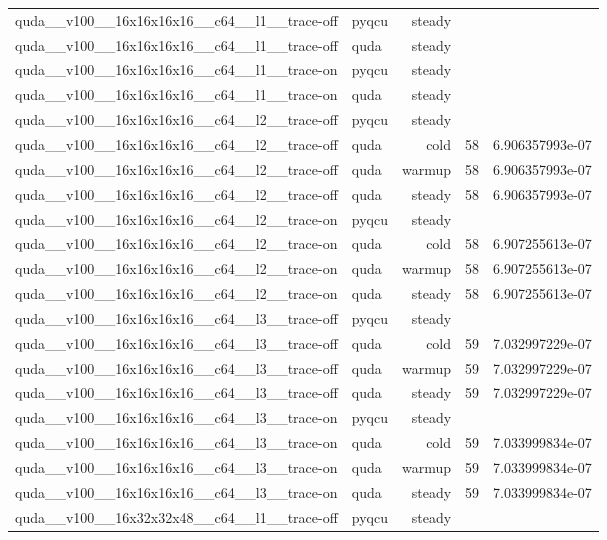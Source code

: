 \begin{table}[htbp]
\begin{tabular}{@{}llrrr@{}}
quda\_\_v100\_\_16x16x16x16\_\_c64\_\_l1\_\_trace-off & pyqcu & steady &  &  \\
quda\_\_v100\_\_16x16x16x16\_\_c64\_\_l1\_\_trace-off & quda & steady &  &  \\
quda\_\_v100\_\_16x16x16x16\_\_c64\_\_l1\_\_trace-on & pyqcu & steady &  &  \\
quda\_\_v100\_\_16x16x16x16\_\_c64\_\_l1\_\_trace-on & quda & steady &  &  \\
quda\_\_v100\_\_16x16x16x16\_\_c64\_\_l2\_\_trace-off & pyqcu & steady &  &  \\
quda\_\_v100\_\_16x16x16x16\_\_c64\_\_l2\_\_trace-off & quda & cold & 58 & 6.906357993e-07 \\
quda\_\_v100\_\_16x16x16x16\_\_c64\_\_l2\_\_trace-off & quda & warmup & 58 & 6.906357993e-07 \\
quda\_\_v100\_\_16x16x16x16\_\_c64\_\_l2\_\_trace-off & quda & steady & 58 & 6.906357993e-07 \\
quda\_\_v100\_\_16x16x16x16\_\_c64\_\_l2\_\_trace-on & pyqcu & steady &  &  \\
quda\_\_v100\_\_16x16x16x16\_\_c64\_\_l2\_\_trace-on & quda & cold & 58 & 6.907255613e-07 \\
quda\_\_v100\_\_16x16x16x16\_\_c64\_\_l2\_\_trace-on & quda & warmup & 58 & 6.907255613e-07 \\
quda\_\_v100\_\_16x16x16x16\_\_c64\_\_l2\_\_trace-on & quda & steady & 58 & 6.907255613e-07 \\
quda\_\_v100\_\_16x16x16x16\_\_c64\_\_l3\_\_trace-off & pyqcu & steady &  &  \\
quda\_\_v100\_\_16x16x16x16\_\_c64\_\_l3\_\_trace-off & quda & cold & 59 & 7.032997229e-07 \\
quda\_\_v100\_\_16x16x16x16\_\_c64\_\_l3\_\_trace-off & quda & warmup & 59 & 7.032997229e-07 \\
quda\_\_v100\_\_16x16x16x16\_\_c64\_\_l3\_\_trace-off & quda & steady & 59 & 7.032997229e-07 \\
quda\_\_v100\_\_16x16x16x16\_\_c64\_\_l3\_\_trace-on & pyqcu & steady &  &  \\
quda\_\_v100\_\_16x16x16x16\_\_c64\_\_l3\_\_trace-on & quda & cold & 59 & 7.033999834e-07 \\
quda\_\_v100\_\_16x16x16x16\_\_c64\_\_l3\_\_trace-on & quda & warmup & 59 & 7.033999834e-07 \\
quda\_\_v100\_\_16x16x16x16\_\_c64\_\_l3\_\_trace-on & quda & steady & 59 & 7.033999834e-07 \\
quda\_\_v100\_\_16x32x32x48\_\_c64\_\_l1\_\_trace-off & pyqcu & steady &  &  \\

\end{tabular}
\end{table}
